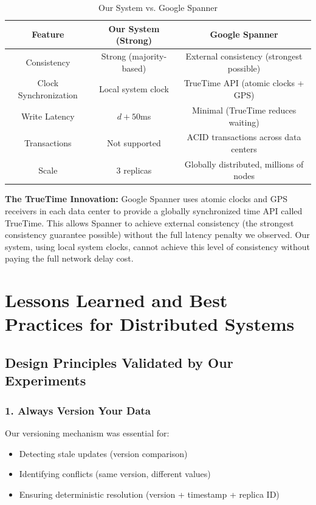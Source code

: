 \documentclass[10pt,a4paper]{article}
\begin{document}
\begin{table}[H]
\centering
\caption{Our System vs. Google Spanner}
\begin{tabular}{|c|c|c|}
\hline
\textbf{Feature} & \textbf{Our System (Strong)} & \textbf{Google Spanner} \\
\hline
Consistency & Strong (majority-based) & External consistency (strongest possible) \\
\hline
Clock Synchronization & Local system clock & TrueTime API (atomic clocks + GPS) \\
\hline
Write Latency & $d + 50$ms & Minimal (TrueTime reduces waiting) \\
\hline
Transactions & Not supported & ACID transactions across data centers \\
\hline
Scale & 3 replicas & Globally distributed, millions of nodes \\
\hline
\end{tabular}
\end{table}

\textbf{The TrueTime Innovation:} Google Spanner uses atomic clocks and GPS receivers in each data center to provide a globally synchronized time API called TrueTime. This allows Spanner to achieve external consistency (the strongest consistency guarantee possible) without the full latency penalty we observed. Our system, using local system clocks, cannot achieve this level of consistency without paying the full network delay cost.

\newpage

\section{Lessons Learned and Best Practices for Distributed Systems}

\subsection{Design Principles Validated by Our Experiments}

\subsubsection{1. Always Version Your Data}

Our versioning mechanism was essential for:
\begin{itemize}
    \item Detecting stale updates (version comparison)
    \item Identifying conflicts (same version, different values)
    \item Ensuring deterministic resolution (version + timestamp + replica ID)
\end{itemize}
\end{document}
